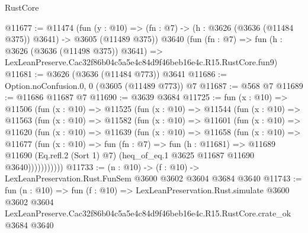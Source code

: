 \begin{lexlean}{RustCore}
\begin{coremodule}
@11677 := @11474
    (fun (y : @10) => (fn : @7) -> (h : @3626 (@3636 (@11484 @375)) @3641) -> @3605 (@11489 @375))
    @3640
    (fun (fn : @7) =>
    fun (h : @3626 (@3636 (@11498 @375)) @3641) =>
    LexLeanPreserve.Cac32f86b04c5a5e4c84d9f46beb16e4c.R15.RustCore.fun9)
@11681 := @3626 (@3636 (@11484 @773)) @3641
@11686 := Option.noConfusion.{0, 0} (@3605 (@11489 @773)) @7
@11687 := @568 @7
@11689 := @11686 @11687 @7
@11690 := @3639 @3684
@11725 := fun (x : @10) =>
  @11506
    (fun (x : @10) =>
    @11525
      (fun (x : @10) =>
      @11544
        (fun (x : @10) =>
        @11563
          (fun (x : @10) =>
          @11582
            (fun (x : @10) =>
            @11601
              (fun (x : @10) =>
              @11620
                (fun (x : @10) =>
                @11639
                  (fun (x : @10) =>
                  @11658
                    (fun (x : @10) =>
                    @11677
                      (fun (x : @10) =>
                      fun (fn : @7) =>
                      fun (h : @11681) =>
                      @11689
                        @11690
                        (Eq.refl.{2} (Sort 1) @7)
                        (heq_of_eq.{1} @3625 @11687 @11690 @3640)))))))))))
@11733 := (n : @10) -> (f : @10) -> LexLeanPreservation.Rust.FunSem @3600 @3602 @3604 @3684 @3640
@11743 := fun (n : @10) =>
  fun (f : @10) =>
  LexLeanPreservation.Rust.simulate
    @3600
    @3602
    @3604
    LexLeanPreserve.Cac32f86b04c5a5e4c84d9f46beb16e4c.R15.RustCore.crate_ok
    @3684
    @3640
\end{coremodule}
\end{lexlean}
